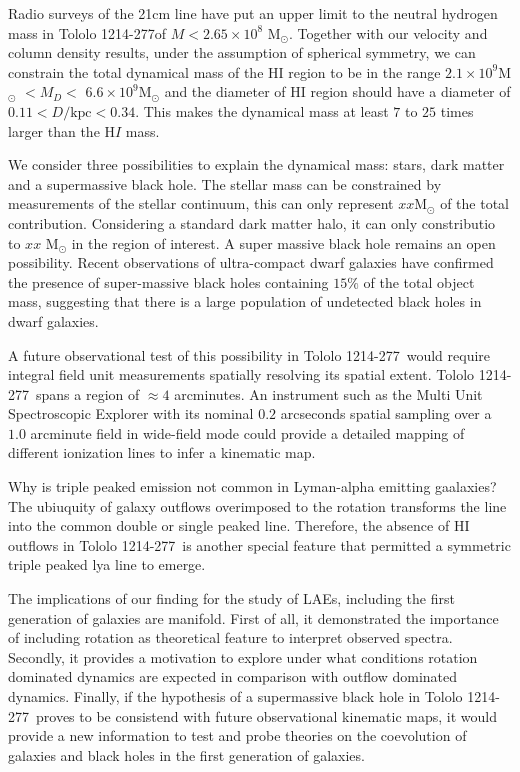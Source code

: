 \documentclass[a4paper, usenatbib, 12pt]{article}
\newcommand{\tol}{Tololo 1214-277}
\begin{document}
{Radio surveys of the 21cm line have put an upper limit to the neutral
hydrogen mass in \tol of $M<2.65\times 10^{8}$ M$_{\odot}$. 
Together with our velocity and column density results, under the
assumption of spherical symmetry, we can constrain the total dynamical
mass of the HI region to be in the range $2.1\times 10^{9}$M$_{\odot}$
$<M_D<$  $6.6\times 10^{9}$M$_{\odot}$ and the diameter of HI region
should have a diameter of $0.11 < D/\mathrm{kpc}<0.34$. 
This makes the
dynamical mass  at least $7$ to $25$ times larger than the H$I$ mass. 

We consider three possibilities to explain the dynamical 
mass: stars, dark matter and a supermassive black hole. 
The stellar mass can be constrained by measurements of the 
stellar continuum, this can only represent $xx$M$_{\odot}$ of the total
contribution. 
Considering a standard dark matter halo, it can only constributio to
$xx$ M$_{\odot}$ in the region of interest. 
A super massive black hole remains an open  possibility. 
Recent observations of ultra-compact dwarf galaxies
\cite{Seth2014} have confirmed the presence of super-massive black
holes containing $15\%$ of the total object mass, suggesting that
there is a large population of undetected black holes in dwarf
galaxies.  

A future observational test of this possibility in \tol\ would require
integral field unit measurements spatially resolving its spatial
extent. 
\tol\ spans a region of $\approx 4$ arcminutes. 
An instrument such as the Multi Unit Spectroscopic Explorer with its
nominal $0.2$ arcseconds spatial sampling over a $1.0$ arcminute field
in wide-field mode could provide a detailed mapping of different
ionization lines to infer a kinematic map.

Why is triple peaked emission not common in  Lyman-alpha emitting
gaalaxies?   
The ubiuquity of galaxy outflows overimposed to the rotation
transforms the line into the common double or single peaked
line.
Therefore, the absence of HI outflows in \tol\ is another special
feature that permitted a symmetric triple peaked lya line to emerge. 

The implications of our finding for the study of LAEs, including the
first generation of galaxies are manifold. 
First of all, it demonstrated the importance of including rotation as
theoretical feature to interpret observed spectra. 
Secondly, it provides a motivation to explore under what conditions
rotation dominated dynamics are expected in comparison with outflow
dominated dynamics. 
Finally, if the hypothesis of a supermassive black
hole in \tol\ proves to be consistend with future observational
kinematic maps, it would provide a new information to test and probe
theories on the coevolution of galaxies and black holes in the first
generation of galaxies. 



}
\end{document}
